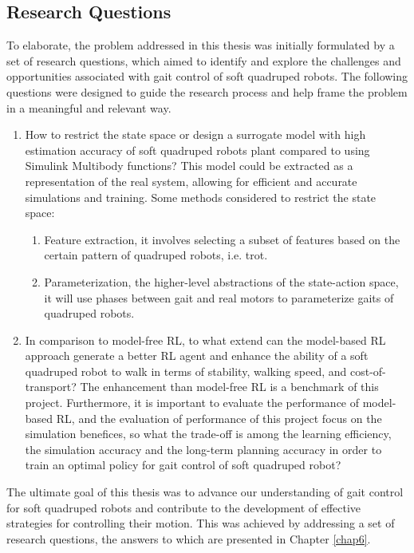  \subsection*{Research Questions}
To elaborate, the problem addressed in this thesis was initially formulated by a set of research questions, which aimed to identify and explore the challenges and opportunities associated with gait control of soft quadruped robots. The following questions were designed to guide the research process and help frame the problem in a meaningful and relevant way.
\begin{enumerate}
    \item \label{rq1}How to restrict the state space or design a surrogate model with high estimation accuracy of soft quadruped robots plant compared to using Simulink Multibody functions? This model could be extracted as a representation of the real system, allowing for efficient and accurate simulations and training. Some methods considered to restrict the state space:
    \begin{enumerate}
        \item Feature extraction, it involves selecting a subset of features based on the certain pattern of quadruped robots, i.e. trot.
        \item Parameterization, the higher-level abstractions of the state-action space, it will use phases between gait and real motors to parameterize gaits of quadruped robots.
    \end{enumerate}
    \item \label{rq2}In comparison to model-free \ac{RL}, to what extend can the model-based \ac{RL} approach generate a better \ac{RL} agent and enhance the ability of a soft quadruped robot to walk in terms of stability, walking speed, and cost-of-transport? The enhancement than model-free \ac{RL} is a benchmark of this project. Furthermore, it is important to evaluate the performance of model-based \ac{RL}, and the evaluation of performance of this project focus on the simulation benefices, so what the trade-off is among the learning efficiency, the simulation accuracy and the long-term planning accuracy in order to train an optimal policy for gait control of soft quadruped robot?
\end{enumerate}
The ultimate goal of this thesis was to advance our understanding of gait control for soft quadruped robots and contribute to the development of effective strategies for controlling their motion. This was achieved by addressing a set of research questions, the answers to which are presented in Chapter \ref{chap6}. 

